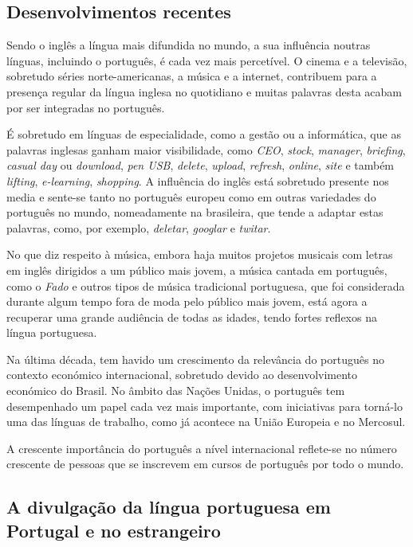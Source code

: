 \documentclass[]{../metanetpaper}
\begin{document}
\begin{multicols}{2}
\subsection{Desenvolvimentos recentes}

Sendo o inglês a língua mais difundida no mundo, a sua influência noutras línguas, incluindo o português, é cada vez mais percetível. O cinema e a televisão, sobretudo séries norte-americanas, a música e a internet, contribuem para a presença regular da língua inglesa no quotidiano e muitas palavras desta acabam por ser integradas no português.

É sobretudo em línguas de especialidade, como a gestão ou a informática, que as palavras inglesas ganham maior visibilidade, como \textit{CEO}, \textit{stock}, \textit{ma\-na\-ger}, \textit{briefing}, \textit{casual day} ou \textit{download}, \textit{pen USB}, \textit{delete}, \textit{upload}, \textit{refresh}, \textit{online}, \textit{site} e também \textit{lifting}, \textit{e-learning}, \textit{shopping}. A influência do inglês está sobretudo presente nos media e sente-se tanto no português europeu como em outras variedades do português no mundo, nomeadamente na brasileira, que tende a adaptar estas palavras, como, por exemplo, \textit{deletar}, \textit{googlar} e \textit{twitar}.

No que diz respeito à música, embora haja muitos projetos musicais com letras em inglês dirigidos a um público mais jovem, a música cantada em português, como o \textit{Fado} e outros tipos de música tradicional portuguesa, que foi considerada durante algum tempo fora de moda pelo público mais jovem, está agora a recuperar uma grande audiência de todas as idades, tendo fortes reflexos na língua portuguesa.

Na última década, tem havido um crescimento da relevância do português no contexto económico internacional, sobretudo devido ao desenvolvimento económico do Brasil. No âmbito das Nações Unidas, o português tem desempenhado um papel cada vez mais importante, com iniciativas para torná-lo uma das línguas de trabalho, como já acontece na União Europeia e no Mercosul.

A crescente importância do português a nível internacional reflete-se no número crescente de pessoas que se inscrevem em cursos de português por todo o mundo.

\subsection{A divulgação da língua portuguesa em Por\-tu\-gal e no es\-tran\-gei\-ro}


\end{multicols}
\end{document}
